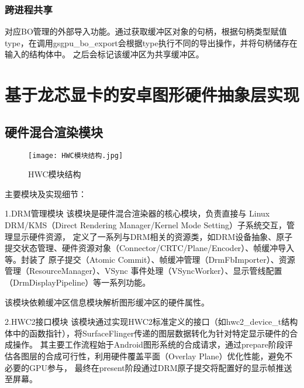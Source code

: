 \subsubsection{跨进程共享}
对应BO管理的外部导入功能。通过获取缓冲区对象的句柄，根据句柄类型赋值type，在调用gsgpu\_bo\_export会根据type执行不同的导出操作，并将句柄储存在输入的结构体中。
之后会标记该缓冲区为共享缓冲区。



\section{基于龙芯显卡的安卓图形硬件抽象层实现}

\subsection{硬件混合渲染模块}

\begin{figure}[h]
  \centering
  \texttt{[image: HWC模块结构.jpg]}
  \caption{HWC模块结构}
  \label{fig:HWC模块结构}
\end{figure}

主要模块及实现细节：

1.DRM管理模块
该模块是硬件混合渲染器的核心模块，负责直接与 Linux DRM/KMS（Direct Rendering Manager/Kernel Mode Setting）子系统交互，管理显示硬件资源，
定义了一系列与DRM相关的资源类，如DRM设备抽象、原子提交状态管理、硬件资源对象（Connector/CRTC/Plane/Encoder）、帧缓冲导入等。封装了
原子提交（Atomic Commit）、帧缓冲管理（DrmFbImporter）、资源管理（ResourceManager）、VSync 事件处理（VSyncWorker）、显示管线配置（DrmDisplayPipeline）等一系列功能。

该模块依赖缓冲区信息模块解析图形缓冲区的硬件属性。

2.HWC2接口模块
该模块通过实现HWC2标准定义的接口（如hwc2\_device\_t结构体中的函数指针），将SurfaceFlinger传递的图层数据转化为针对特定显示硬件的合成操作。
其主要工作流程始于Android图形系统的合成请求，通过prepare阶段评估各图层的合成可行性，利用硬件覆盖平面（Overlay Plane）优化性能，避免不必要的GPU参与，
最终在present阶段通过DRM原子提交将配置好的显示帧推送至屏幕。

